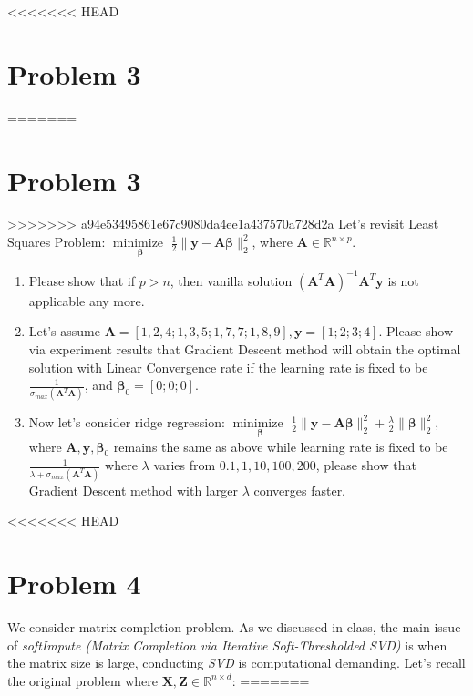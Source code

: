 \documentclass[11pt]{article}
\newcommand{\R}{\mathbb{R}}
\newcommand{\minimize}{\operatorname*{minimize\ }}
\newcommand{\mtx}[1]{\mathbf{#1}}
\newcommand{\vct}[1]{\mathbf{#1}}
\def \mA {\mtx{A}}
\def \mX {\mtx{X}}
\def \mZ {\mtx{Z}}
\def \vy {\vct{y}}
\def \R {\mathbb{R}}
\begin{document}
	
	
	
<<<<<<< HEAD
	\section{Problem 3}
=======
	\section*{Problem 3}
>>>>>>> a94e53495861e67c9080da4ee1a437570a728d2a
	Let's revisit Least Squares Problem: $\minimize \limits_{\bm{\beta}} \frac{1}{2}\|\vy-\mA\bm{\beta}\|^2_2$, where $\mA\in\R^{n\times p}$.
	\begin{enumerate}
		\item Please show that if $p>n$, then vanilla solution $(\mA^T\mA)^{-1}\mA^T\vy$ is not applicable any more.	
		\item Let's assume $\mA=[1, 2, 4;1, 3, 5; 1, 7, 7; 1, 8, 9], \vy=[1;2;3;4]$. Please show via experiment results that Gradient Descent method will obtain the optimal solution with  Linear Convergence rate if the learning rate is fixed to be $\frac{1}{\sigma_{max}(\mA^T\mA)}$, and $\bm{\beta}_0=[0;0;0]$.	
		\item Now let's consider ridge regression: $\minimize \limits_{\bm{\beta}} \frac{1}{2}\|\vy-\mA\bm{\beta}\|^2_2+\frac{\lambda}{2} \|\bm{\beta}\|^2_2$, where  $\mA,\vy,\bm{\beta}_0$ remains the same as above while learning rate is fixed to be $\frac{1}{\lambda+\sigma_{max}(\mA^T\mA)}$ where $\lambda$ varies from $0.1,1,10,100,200$, please show that Gradient Descent method with larger $\lambda$ converges faster. 
	\end{enumerate}
	\vspace{2.5cm}
	
<<<<<<< HEAD
	\section{Problem 4}
	We consider matrix completion problem. As we discussed in class, the main issue of \textit{softImpute (Matrix Completion via Iterative Soft-Thresholded SVD)} is 
	when the matrix size is large, conducting \textit{SVD} is computational demanding. Let's recall the original problem where 
	$\mX, \mZ \in\mathbb{R}^{n\times d}$: 
=======
\end{document}
